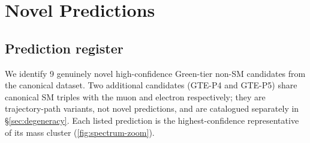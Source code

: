 \documentclass[12pt]{article}
\numberwithin{equation}{section}
\begin{document}
\section{Novel Predictions}
\label{sec:predictions}

\subsection{Prediction register}

We identify 9 genuinely novel high-confidence Green-tier non-SM candidates from the canonical dataset. Two additional candidates (GTE-P4 and GTE-P5) share canonical SM triples with the muon and electron respectively; they are trajectory-path variants, not novel predictions, and are catalogued separately in \S\ref{sec:degeneracy}. Each listed prediction is the highest-confidence representative of its mass cluster (\cref{fig:spectrum-zoom}).
\end{document}
